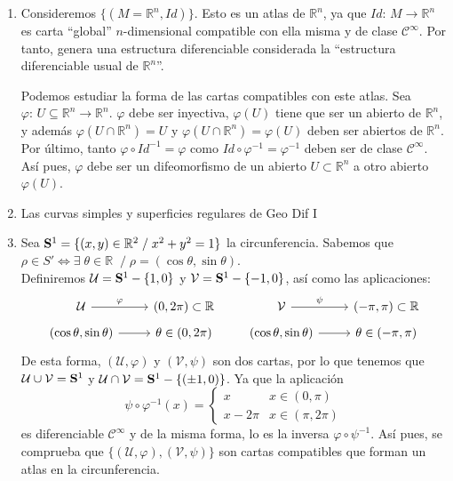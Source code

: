 \begin{ejems} \:
\begin{enumerate}
    \item Consideremos $\{(M=\mathbb{R}^n,Id)\}$. Esto es un atlas de $\mathbb{R}^n$, ya que $Id:\,M \longrightarrow \mathbb{R}^n$ es carta ``global'' $n$-dimensional compatible con ella misma y de clase $\mathcal{C}^{\infty}$. Por tanto, genera una estructura diferenciable considerada la ``estructura diferenciable usual de $\mathbb{R}^n$''.
    
    Podemos estudiar la forma de las cartas compatibles con este atlas. Sea $\varphi:\,U\subseteq \mathbb{R}^n\longrightarrow\mathbb{R}^n$. $\varphi$ debe ser inyectiva, $\varphi(U)$ tiene que ser un abierto de $\mathbb{R}^n$, y además $\varphi(U \cap \mathbb{R}^n) = U$ y $\varphi(U\cap \mathbb{R}^n)= \varphi(U)$ deben ser abiertos de $\mathbb{R}^n$. Por último, tanto $\varphi \circ Id^{-1} = \varphi$ como $Id \circ \varphi^{-1} = \varphi^{-1}$ deben ser de clase $\mathcal{C}^{\infty}$. As\'i pues, $\varphi$ debe ser un difeomorfismo de un abierto $U \subset \mathbb R^n$ a otro abierto $\varphi(U)$.
    \item Las curvas simples y superficies regulares de Geo Dif I
    
    \item Sea $\bold S^1=\{(x,y)\in\mathbb{R}^2 \;/\; x^2+y^2=1\}$ la circunferencia. Sabemos que $\rho \in S' \iff \exists \;\theta \in \mathbb{R}\;\; /\; \rho=(\cos{\theta}, \sin{\theta})$. \\
    Definiremos $\mathcal{U}=\bold S^1 - \{1,0\}$ y $\mathcal{V} = \bold S^1 - \{-1,0\}$, así como las aplicaciones:$$\begin{tikzcd}
    \mathcal{U} \arrow{r}{\varphi} & (0,2\pi) \subset \mathbb{R}\\[-5mm]
    (\cos{\theta}, \sin{\theta}) \arrow{r} & \theta \in (0,2\pi)
    \end{tikzcd} \qquad \begin{tikzcd}
    \mathcal{V} \arrow{r}{\psi} & (-\pi, \pi) \subset  \mathbb{R}\\[-5mm]
    (\cos{\theta}, \sin{\theta}) \arrow{r} & \theta \in (-\pi,\pi)
    \end{tikzcd}$$
    De esta forma, $(\mathcal{U}, \varphi)$ y $(\mathcal{V}, \psi)$ son dos cartas, por lo que tenemos que $\mathcal{U} \cup \mathcal{V} = \bold S^1$ y $\mathcal{U} \cap \mathcal{V} = \bold S^1-\{(\pm 1,0)\}$. Ya que la aplicaci\'on $$\psi \circ \varphi^{-1}(x)=\left\{\begin{array}{ll}
         x & x\in (0,\pi)  \\
         x-2\pi & x\in(\pi,2\pi) 
    \end{array}\right.$$ es diferenciable $\mathcal C^{\infty}$ y de la misma forma, lo es la inversa $\varphi \circ \psi^{-1}$. As\'i pues, se comprueba que $\{(\mathcal{U}, \varphi), (\mathcal{V}, \psi)\}$ son cartas compatibles que forman un atlas en la circunferencia.
    

\end{enumerate}
\end{ejems}
